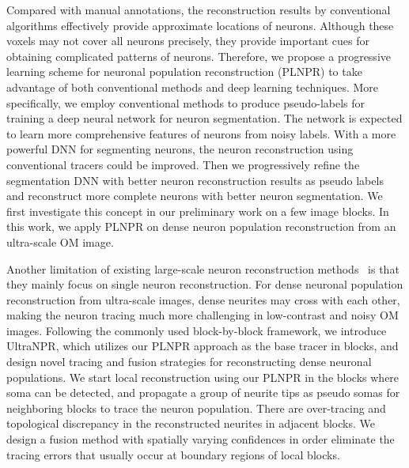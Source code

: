 Compared with manual annotations, the reconstruction results by conventional algorithms effectively provide approximate locations of neurons. 
Although these voxels may not cover all neurons precisely, they provide important cues for obtaining complicated patterns of neurons.
Therefore, we propose a progressive learning scheme for neuronal population reconstruction (PLNPR) to take advantage of both conventional methods and deep learning techniques.
More specifically, we employ conventional methods to produce pseudo-labels for training a deep neural network for neuron segmentation. 
The network is expected to learn more comprehensive features of neurons from noisy labels. 
With a more powerful DNN for segmenting neurons, the neuron reconstruction using conventional tracers could be improved. 
Then we progressively refine the segmentation DNN with better neuron reconstruction results as pseudo labels and reconstruct more complete neurons with better neuron segmentation.
We first investigate this concept in our preliminary work \cite{Zhao2019} on a few image blocks. 
In this work, we apply PLNPR on dense neuron population reconstruction from an ultra-scale OM image. 

Another limitation of existing large-scale neuron reconstruction methods~\cite{Zhou2015, Peng2017, Wang2018} is that they mainly focus on single neuron reconstruction. 
%
For dense neuronal population reconstruction from ultra-scale images, dense neurites may cross with each other, making the neuron tracing much more challenging in low-contrast and noisy OM images. 
% 
Following the commonly used block-by-block framework, we introduce UltraNPR, which utilizes our PLNPR approach as the base tracer in blocks, and design novel tracing and fusion strategies for reconstructing dense neuronal populations.
%
We start local reconstruction using our PLNPR in the blocks where soma can be detected, and propagate a group of neurite tips as pseudo somas for neighboring blocks to trace the neuron population. 
%
There are over-tracing and topological discrepancy in the reconstructed neurites in adjacent blocks. 
We design a fusion method with spatially varying confidences in order eliminate the tracing errors that usually occur at boundary regions of local blocks.   


